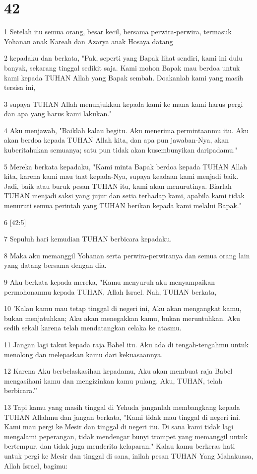\chapter{42}

\par 1 Setelah itu semua orang, besar kecil, bersama perwira-perwira, termasuk Yohanan anak Kareah dan Azarya anak Hosaya datang
\par 2 kepadaku dan berkata, "Pak, seperti yang Bapak lihat sendiri, kami ini dulu banyak, sekarang tinggal sedikit saja. Kami mohon Bapak mau berdoa untuk kami kepada TUHAN Allah yang Bapak sembah. Doakanlah kami yang masih tersisa ini,
\par 3 supaya TUHAN Allah menunjukkan kepada kami ke mana kami harus pergi dan apa yang harus kami lakukan."
\par 4 Aku menjawab, "Baiklah kalau begitu. Aku menerima permintaanmu itu. Aku akan berdoa kepada TUHAN Allah kita, dan apa pun jawaban-Nya, akan kuberitahukan semuanya; satu pun tidak akan kusembunyikan daripadamu."
\par 5 Mereka berkata kepadaku, "Kami minta Bapak berdoa kepada TUHAN Allah kita, karena kami mau taat kepada-Nya, supaya keadaan kami menjadi baik. Jadi, baik atau buruk pesan TUHAN itu, kami akan menurutinya. Biarlah TUHAN menjadi saksi yang jujur dan setia terhadap kami, apabila kami tidak menuruti semua perintah yang TUHAN berikan kepada kami melalui Bapak."
\par 6 [42:5]
\par 7 Sepuluh hari kemudian TUHAN berbicara kepadaku.
\par 8 Maka aku memanggil Yohanan serta perwira-perwiranya dan semua orang lain yang datang bersama dengan dia.
\par 9 Aku berkata kepada mereka, "Kamu menyuruh aku menyampaikan permohonanmu kepada TUHAN, Allah Israel. Nah, TUHAN berkata,
\par 10 'Kalau kamu mau tetap tinggal di negeri ini, Aku akan mengangkat kamu, bukan menjatuhkan; Aku akan menegakkan kamu, bukan meruntuhkan. Aku sedih sekali karena telah mendatangkan celaka ke atasmu.
\par 11 Jangan lagi takut kepada raja Babel itu. Aku ada di tengah-tengahmu untuk menolong dan melepaskan kamu dari kekuasaannya.
\par 12 Karena Aku berbelaskasihan kepadamu, Aku akan membuat raja Babel mengasihani kamu dan mengizinkan kamu pulang. Aku, TUHAN, telah berbicara.'"
\par 13 Tapi kamu yang masih tinggal di Yehuda janganlah membangkang kepada TUHAN Allahmu dan jangan berkata, "Kami tidak mau tinggal di negeri ini. Kami mau pergi ke Mesir dan tinggal di negeri itu. Di sana kami tidak lagi mengalami peperangan, tidak mendengar bunyi trompet yang memanggil untuk bertempur, dan tidak juga menderita kelaparan." Kalau kamu berkeras hati untuk pergi ke Mesir dan tinggal di sana, inilah pesan TUHAN Yang Mahakuasa, Allah Israel, bagimu:
